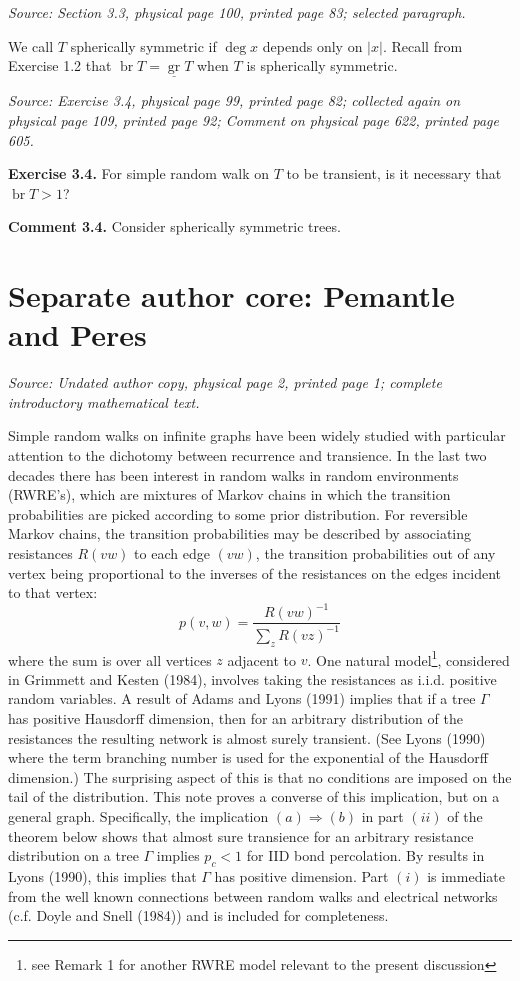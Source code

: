 \documentclass[11pt]{article}
\newcommand{\br}{\operatorname{br}}
\newcommand{\grlow}{\underline{\operatorname{gr}}}
\newcommand{\src}[1]{\par\smallskip\noindent\textit{Source: #1.}\par\nopagebreak[4]\smallskip}
\begin{document}
\src{Section 3.3, physical page 100, printed page 83; selected paragraph}
We call $T$ spherically symmetric if $\deg x$ depends only on $|x|$.
Recall from Exercise 1.2 that $\br T=\grlow T$ when $T$ is spherically symmetric.

\src{Exercise 3.4, physical page 99, printed page 82; collected again on physical page 109, printed page 92; Comment on physical page 622, printed page 605}
\noindent\textbf{Exercise 3.4.}
For simple random walk on $T$ to be transient, is it necessary that $\br T>1$?

\noindent\textbf{Comment 3.4.} Consider spherically symmetric trees.

\clearpage
\section*{Separate author core: Pemantle and Peres}
\src{Undated author copy, physical page 2, printed page 1; complete introductory mathematical text}
Simple random walks on infinite graphs have been widely studied with
particular attention to the dichotomy between recurrence and transience.
In the last two decades there has been interest in random walks in random
environments (RWRE's), which are mixtures of Markov chains in which the
transition probabilities are picked according to some prior distribution.
For reversible Markov chains, the transition probabilities may be described
by associating resistances $R(vw)$ to each edge $(vw)$, the transition
probabilities out of any vertex being proportional to the inverses of the
resistances on the edges incident to that vertex:
\begin{equation}\tag{1}
p(v,w)=\frac{R(vw)^{-1}}{\sum_z R(vz)^{-1}}
\end{equation}
where the sum is over all vertices $z$ adjacent to $v$.
One natural model\footnote[4]{see Remark 1 for another RWRE model relevant to the present discussion},
considered in Grimmett and Kesten (1984), involves taking the resistances
as i.i.d. positive random variables. A result of Adams and Lyons (1991)
implies that if a tree $\Gamma$ has positive Hausdorff dimension, then for
an arbitrary distribution of the resistances the resulting network is
almost surely transient. (See Lyons (1990) where the term branching number
is used for the exponential of the Hausdorff dimension.) The surprising
aspect of this is that no conditions are imposed on the tail of the
distribution. This note proves a converse of this implication, but on a
general graph. Specifically, the implication $(a)\Rightarrow(b)$ in part
$(ii)$ of the theorem below shows that almost sure transience for an
arbitrary resistance distribution on a tree $\Gamma$ implies $p_c<1$ for
IID bond percolation. By results in Lyons (1990), this implies that $\Gamma$
has positive dimension. Part $(i)$ is immediate from the well known
connections between random walks and electrical networks (c.f. Doyle and
Snell (1984)) and is included for completeness.
\end{document}
